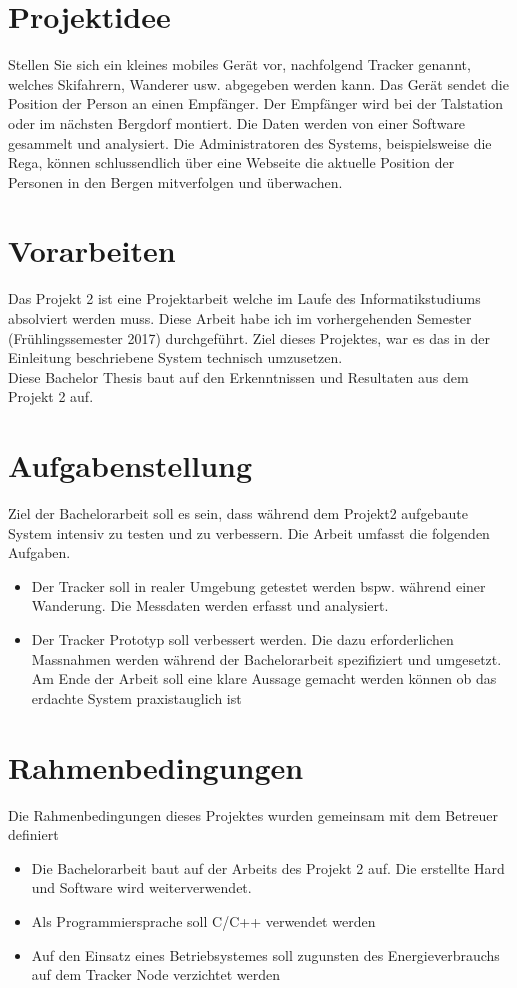 \documentclass[11pt,english,german]{report}
\theoremstyle{definition}
\begin{document}
\newpage
\section{Projektidee}
Stellen Sie sich ein kleines mobiles Gerät vor, nachfolgend Tracker genannt, welches Skifahrern, Wanderer usw. abgegeben werden kann. Das Gerät sendet die Position der Person an einen Empfänger. Der Empfänger wird bei der Talstation oder im nächsten Bergdorf montiert. Die Daten werden von einer Software gesammelt und analysiert. Die Administratoren des Systems, beispielsweise die Rega, können schlussendlich über eine Webseite die aktuelle Position der Personen in den Bergen mitverfolgen und überwachen.

\section{Vorarbeiten}
Das Projekt 2 ist eine Projektarbeit welche im Laufe des Informatikstudiums absolviert werden muss. Diese Arbeit habe ich im vorhergehenden Semester (Frühlingssemester 2017) durchgeführt. Ziel dieses Projektes, war es das in der Einleitung beschriebene System technisch umzusetzen.\\[0.3cm]
Diese Bachelor Thesis baut auf den Erkenntnissen und Resultaten aus dem Projekt 2 auf.

\section{Aufgabenstellung}
Ziel der Bachelorarbeit soll es sein, dass während dem Projekt2 aufgebaute System intensiv zu testen und zu verbessern. Die Arbeit umfasst die folgenden Aufgaben.
\begin{itemize}
\item
Der Tracker soll in realer Umgebung getestet werden bspw. während einer Wanderung. Die Messdaten werden erfasst und analysiert.
\item Der Tracker Prototyp soll verbessert werden. Die dazu erforderlichen Massnahmen werden während der Bachelorarbeit spezifiziert und umgesetzt. Am Ende der Arbeit soll eine klare Aussage gemacht werden können ob das erdachte System praxistauglich ist
\end{itemize}

\section{Rahmenbedingungen}
Die Rahmenbedingungen dieses Projektes wurden gemeinsam mit dem Betreuer definiert
\begin{itemize}
\item Die Bachelorarbeit baut auf der Arbeits des Projekt 2 auf. Die erstellte Hard und Software wird weiterverwendet.
\item Als Programmiersprache soll C/C++ verwendet werden
\item Auf den Einsatz eines Betriebsystemes soll zugunsten des Energieverbrauchs auf dem Tracker Node verzichtet werden
\end{itemize}
\end{document}
